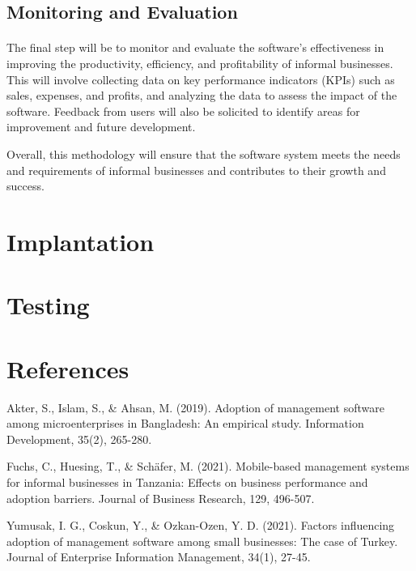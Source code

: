 \documentclass{article}
\begin{document}
\subsection{Monitoring and Evaluation}
\paragraph*{}
The final step will be to monitor and evaluate the software's effectiveness in improving the productivity, efficiency, and profitability of informal businesses. This will involve collecting data on key performance indicators (KPIs) such as sales, expenses, and profits, and analyzing the data to assess the impact of the software. Feedback from users will also be solicited to identify areas for improvement and future development.

Overall, this methodology will ensure that the software system meets the needs and requirements of informal businesses and contributes to their growth and success.
\newpage


\section{Implantation}
\lipsum[1-2]
\newpage


\section{Testing}
\lipsum[1-2]
\newpage


\section{References}
\renewcommand{\refname}{}
\begin{thebibliography}{10}
	
	Akter, S., Islam, S., \& Ahsan, M. (2019). Adoption of management software among microenterprises in Bangladesh: An empirical study. Information Development, 35(2), 265-280.

	Fuchs, C., Huesing, T., \& Schäfer, M. (2021). Mobile-based management systems for informal businesses in Tanzania: Effects on business performance and adoption barriers. Journal of Business Research, 129, 496-507.

	Yumusak, I. G., Coskun, Y., \& Ozkan-Ozen, Y. D. (2021). Factors influencing adoption of management software among small businesses: The case of Turkey. Journal of Enterprise Information Management, 34(1), 27-45.

\end{thebibliography}
\end{document}
